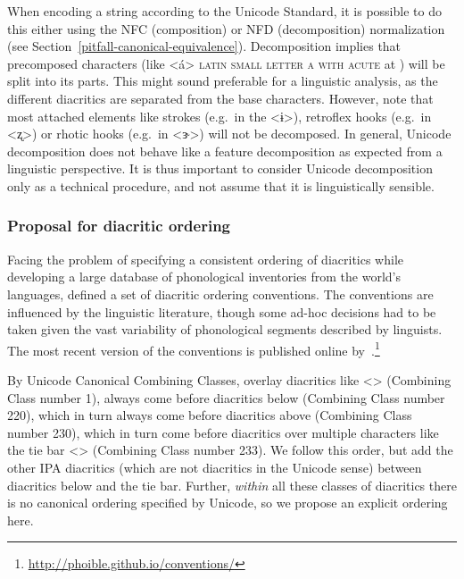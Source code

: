 
When encoding a string according to the Unicode Standard, it is possible to do
this either using the NFC (composition) or NFD (decomposition) normalization (see
Section~\ref{pitfall-canonical-equivalence}).
Decomposition implies that precomposed characters (like <á> \textsc{latin small
letter a with acute} at ) will be split into its parts. This might
sound preferable for a linguistic analysis, as the different diacritics are
separated from the base characters. However, note that most attached elements
like strokes (e.g.~in the <ɨ>), retroflex hooks (e.g.~in <ʐ>) or rhotic hooks
(e.g.~in <ɝ>) will not be decomposed. In
general, Unicode decomposition does not behave like a feature decomposition as
expected from a linguistic perspective. It is thus important to consider Unicode
decomposition only as a technical procedure, and not assume that it is
linguistically sensible.

\subsubsection*{Proposal for diacritic ordering}

Facing the problem of specifying a consistent ordering of diacritics while
developing a large database of phonological inventories from the world's
languages, \citet[540]{Moran2012} defined a set of diacritic ordering
conventions. The conventions are influenced by the linguistic literature, though
some ad-hoc decisions had to be taken given the vast variability of phonological
segments described by linguists. The most recent version of the conventions 
is published online by~\citet{MoranMcCloy2014}.\footnote{\url{http://phoible.github.io/conventions/}}

By Unicode Canonical Combining Classes, overlay diacritics 
like <> (Combining Class number 1), always come before diacritics
below (Combining Class number 220), which in turn always come before diacritics
above (Combining Class number 230), which in turn come before diacritics over
multiple characters like the tie bar <>
(Combining Class number 233). We follow this order, but add the other IPA
diacritics (which are not diacritics in the Unicode sense) between diacritics
below and the tie bar. Further, \textit{within} all these classes of diacritics
there is no canonical ordering specified by Unicode, so we propose an explicit
ordering here.

